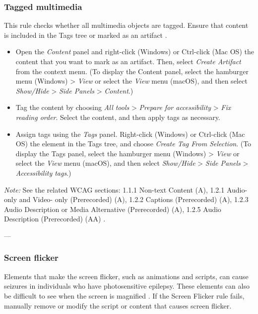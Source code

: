 \subsubsection{Tagged multimedia}
\label{subsubsec:acrobat-tagged-multimedia}
This rule checks whether all multimedia objects are tagged. Ensure that content is included in the Tags tree or marked as an artifact \cite{AdobeHelpX}.
\begin{itemize}
    \item Open the \emph{Content} panel and right-click (Windows) or Ctrl-click (Mac OS) the content that you want to mark as an artifact. Then, select \emph{Create Artifact} from the context menu. (To display the Content panel, select the hamburger menu (Windows) > \emph{View} or select the \emph{View} menu (macOS), and then select \emph{Show/Hide} > \emph{Side Panels} > \emph{Content}.)
    \item Tag the content by choosing \emph{All tools} > \emph{Prepare for accessibility} > \emph{Fix reading order}. Select the content, and then apply tags as necessary.
    \item Assign tags using the \emph{Tags} panel. Right-click (Windows) or Ctrl-click (Mac OS) the element in the Tags tree, and choose \emph{Create Tag From Selection}. (To display the Tags panel, select the hamburger menu (Windows) > \emph{View} or select the \emph{View} menu (macOS), and then select \emph{Show/Hide} > \emph{Side Panels} > \emph{Accessibility tags}.)
\end{itemize}

\vspace{0.5em}
\noindent\textit{Note:} See the related WCAG sections: 1.1.1 Non-text Content (A), 1.2.1 Audio- only and Video- only (Prerecorded) (A), 1.2.2 Captions (Prerecorded) (A), 1.2.3 Audio Description or Media Alternative (Prerecorded) (A), 1.2.5 Audio Description (Prerecorded) (AA) \cite{WCAG}.

---

\subsubsection{Screen flicker}
\label{subsubsec:acrobat-screen-flicker}
Elements that make the screen flicker, such as animations and scripts, can cause seizures in individuals who have photosensitive epilepsy. These elements can also be difficult to see when the screen is magnified \cite{AdobeHelpX}.
If the Screen Flicker rule fails, manually remove or modify the script or content that causes screen flicker.

